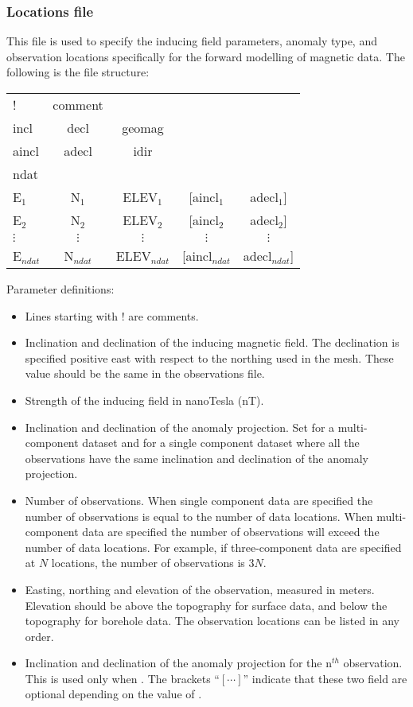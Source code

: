 \subsubsection{Locations file}
This file is used to specify the inducing field parameters, anomaly type, and observation locations specifically for the forward modelling of magnetic data. The following is the file structure:
%
\begin{fileExample}
\begin{tabular}{|lcccc|}
\hline
! & comment & & &  \\
incl & decl & geomag  & & \\
aincl & adecl & idir  & & \\
ndat & & & &  \\
E$_1$ & N$_1$ & ELEV$_1$ & [aincl$_1$ & adecl$_1$] \\
E$_2$ & N$_2$ & ELEV$_2$ & [aincl$_2$ & adecl$_2$] \\
$\vdots$ & $\vdots$ & $\vdots$ & $\vdots$ & $\vdots$ \\
E$_{ndat}$ & N$_{ndat}$ & ELEV$_{ndat}$ & [aincl$_{ndat}$ & adecl$_{ndat}$] \\
\hline
\end{tabular}
\end{fileExample}
%
Parameter definitions:
%
\begin{itemize}
\item[\codeName{!}] Lines starting with ! are comments.
\item[\codeName{incl/decl}] Inclination and declination of the inducing magnetic field. The declination is specified positive east with respect to the northing used in the mesh. These value should be the same in the observations file. 
\item[\codeName{geomag}] Strength of the inducing field in nanoTesla (nT).
\item[\codeName{aincl/adecl/idir}] Inclination and declination of the anomaly projection. Set  for a multi-component dataset and  for a single component dataset where all the observations have the same inclination and declination of the anomaly projection.
\item[\codeName{ndat}] Number of observations. When single component data are specified the number of observations is equal to the number of data locations. When multi-component data are specified the number of observations will exceed the number of data locations. For example, if three-component data are specified at $N$ locations, the number of observations is $3N$.
\item[\codeName{E$_n$,N$_n$,Elev$_n$}] Easting, northing and elevation of the observation, measured in meters. Elevation should be above the topography for surface data, and below the topography for borehole data. The observation locations can be listed in any order.
\item[\codeName{ainc$_n$/adec$_n$}] Inclination and declination of the anomaly projection for the n$^{th}$ observation. This is used only when . The brackets ``$[\cdots]$'' indicate that these two field are optional depending on the value of .
\end{itemize}
